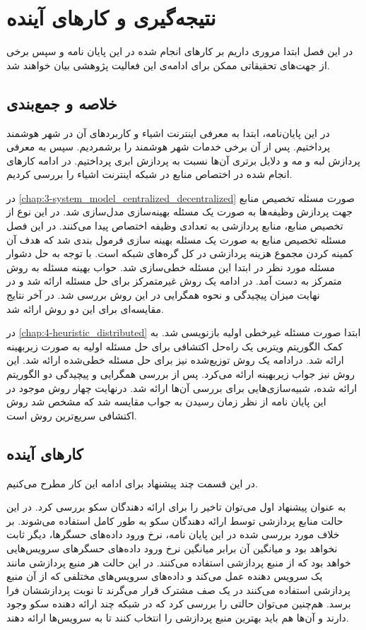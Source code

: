 \chapter{نتیجه‌گیری و کار‌های آینده}\label{chap:conclusion}
  \thispagestyle{empty}
  در این فصل ابتدا مروری داریم بر کار‌های انجام شده در این پایان نامه و سپس برخی از جهت‌های تحقیقاتی ممکن برای ادامه‌ی این فعالیت پژوهشی بیان خواهند شد.

  \section{خلاصه و جمع‌بندی}
    در این پایان‌نامه، ابتدا به معرفی اینترنت اشیاء و کاربرد‌های آن در شهر هوشمند پرداختیم.
    پس از آن برخی خدمات شهر هوشمند را برشمردیم.
    سپس به معرفی پردازش لبه و مه و دلایل برتری آن‌ها نسبت به پردازش ابری پرداختیم.
    در ادامه کار‌های انجام شده در اختصاص منابع در شبکه اینترنت اشیاء را بررسی کردیم.

    در \cref{chap:3-system_model_centralized_decentralized} صورت مسئله تخصیص منابع جهت پردازش وظیفه‌ها به صورت یک مسئله بهینه‌سازی مدل‌سازی شد. 
    در این نوع از تخصیص منابع، منابع پردازشی به تعدادی وظیفه اختصاص پیدا می‌کنند.
    در این فصل مسئله تخصیص منابع به صورت یک مسئله بهینه سازی فرمول بندی شد که هدف آن کمینه کردن مجموع هزینه پردازشی در کل گره‌های شبکه است.
    با توجه به حل دشوار مسئله مورد نظر در ابتدا این مسئله خطی‌سازی شد. حواب بهینه مسئله به روش متمرکز به دست آمد.
    در ادامه یک روش غیرمتمرکز برای حل مسئله ارائه شد و در نهایت میزان پیچیدگی و نحوه همگرایی در این روش بررسی شد. در آخر نتایج مقایسه‌ای برای این دو روش ارائه شد.

    در \cref{chap:4-heuristic_distributed} ابتدا صورت مسئله غیرخطی اولیه بازنویسی شد.
    به کمک الگوریتم ویتربی یک راه‌حل اکتشافی برای حل مسئله اولیه به صورت زیر‌بهینه ارائه شد.
	درادامه یک روش توزیع‌شده نیز برای حل مسئله خطی‌‌شده ارائه شد. این روش نیز جواب زیربهینه ارائه می‌کرد. 
    پس از بررسی همگرایی و پیچیدگی دو الگوریتم ارائه شده، شبیه‌سازی‌هایی برای بررسی آن‌ها ارائه شد.
    درنهایت چهار روش موجود در این پایان نامه از نظر زمان رسیدن به جواب مقایسه شد که مشخص شد روش اکتشافی سریع‌ترین روش است. 

  \section{کار‌های آینده}
    در این قسمت چند پیشنهاد برای ادامه این کار مطرح می‌کنیم.
  
    به عنوان پیشنهاد اول می‌توان تاخیر را برای ارائه دهندگان سکو بررسی کرد.
    در این حالت منابع پردازشی توسط ارائه دهندگان سکو به طور کامل استفاده می‌شوند.
    بر خلاف مورد بررسی شده در این پایان نامه، نرخ ورود داده‌های حسگر‌ها، دیگر ثابت نخواهد بود و میانگین آن برابر میانگین نرخ ورود داده‌های حسگر‌های سرویس‌هایی خواهد بود که از منبع پردازشی استفاده می‌کنند.
    در این حالت هر منبع پردازشی مانند یک سرویس دهنده عمل می‌کند و داده‌های سرویس‌های مختلفی که از آن منبع پردازشی استفاده می‌کنند در یک صف مشترک قرار می‌گرند تا نوبت پردازششان فرا برسد.
    هم‌چنین می‌توان حالتی را بررسی کرد که در شبکه چند ارائه دهنده سکو وجود دارند و آن‌ها هم باید بهترین منبع پردازشی را انتخاب کنند تا به سرویس‌ها ارائه دهند.

